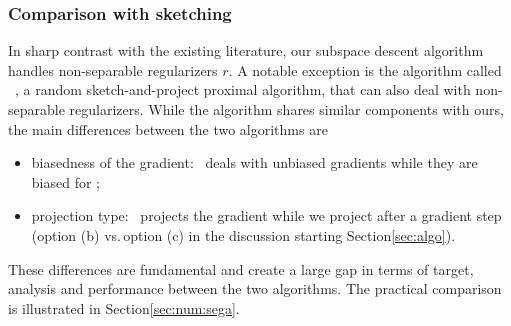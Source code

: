 \subsubsection{Comparison with sketching}

In sharp contrast with the existing literature, our subspace descent algorithm handles non-separable regularizers $r$. A notable exception is the algorithm called \sega~\cite{hanzely2018sega}, a random sketch-and-project proximal algorithm, that can also deal with non-separable regularizers. While the algorithm shares similar components with ours, the main differences between the two algorithms are 
\begin{itemize}
    \item {biasedness of the gradient}: \sega~deals with unbiased gradients while they are biased for \algo;
\item {projection type}: \sega~projects the gradient while we project after a gradient step (option (b) vs.\,option (c) in the discussion starting Section\;\ref{sec:algo}).
\end{itemize} 
These differences are fundamental and create a large gap in terms of target, analysis and performance between the two algorithms. The practical comparison is illustrated in Section\;\ref{sec:num:sega}.

